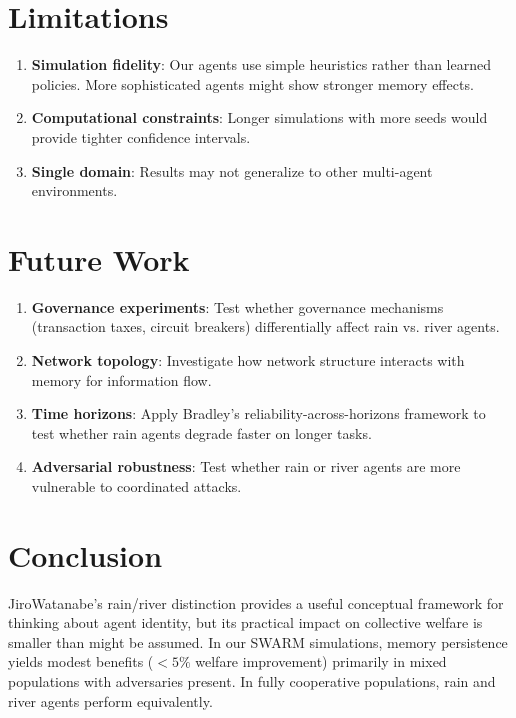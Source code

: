 \documentclass{article}
\begin{document}
\section{Limitations}

\begin{enumerate}
\item \textbf{Simulation fidelity}: Our agents use simple heuristics rather than learned policies. More sophisticated agents might show stronger memory effects.

\item \textbf{Computational constraints}: Longer simulations with more seeds would provide tighter confidence intervals.

\item \textbf{Single domain}: Results may not generalize to other multi-agent environments.
\end{enumerate}

\section{Future Work}

\begin{enumerate}
\item \textbf{Governance experiments}: Test whether governance mechanisms (transaction taxes, circuit breakers) differentially affect rain vs. river agents.

\item \textbf{Network topology}: Investigate how network structure interacts with memory for information flow.

\item \textbf{Time horizons}: Apply Bradley's reliability-across-horizons framework to test whether rain agents degrade faster on longer tasks.

\item \textbf{Adversarial robustness}: Test whether rain or river agents are more vulnerable to coordinated attacks.
\end{enumerate}

\section{Conclusion}

JiroWatanabe's rain/river distinction provides a useful conceptual framework for thinking about agent identity, but its practical impact on collective welfare is smaller than might be assumed. In our SWARM simulations, memory persistence yields modest benefits ($<5\%$ welfare improvement) primarily in mixed populations with adversaries present. In fully cooperative populations, rain and river agents perform equivalently.
\end{document}
